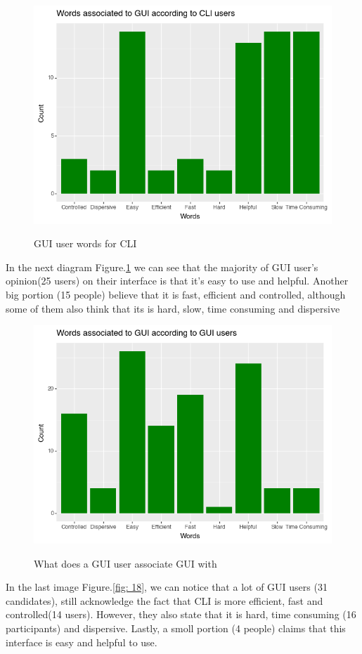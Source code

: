 \documentclass[]{report}
\begin{document}
	\begin{figure}[H]
		\centering
		\includegraphics[width=0.75\linewidth]{WordsGUIfromCLI}\\
		\caption{GUI user words for CLI}
		\label{fig: 17}
	\end{figure}
	
	In the next diagram Figure.\ref{fig: 17} we can see that the majority of GUI user's opinion(25 users) on their interface is that it's easy to use and helpful. Another big portion (15 people) believe that it is fast, efficient and controlled, although some of them also think that its is hard, slow, time consuming and dispersive
	
	\begin{figure}[H]
		\centering
		\includegraphics[width=0.75\linewidth]{WordsGUIfromGUI}\\
		\caption{What does a GUI user associate GUI with}
		\label{fig: 16}
	\end{figure}
	
	In the last image Figure.\ref{fig: 18}, we can notice that a lot of GUI users (31 candidates), still acknowledge the fact that CLI is more efficient, fast and controlled(14 users). However, they also state that it is hard, time consuming (16 participants) and dispersive. Lastly, a smoll portion (4 people) claims that this interface is easy and helpful to use.
	
\end{document}
